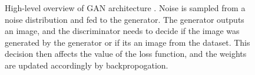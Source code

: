 \begin{figure}
{
    }
    \caption{High-level overview of GAN architecture \cite{gan}. Noise is sampled from a noise distribution and fed to the generator. The generator outputs an image, and the discriminator needs to decide if the image was generated by the generator or if its an image from the dataset. This decision then affects the value of the loss function, and the weights are updated accordingly by backpropogation.}
    \label{fig:gan_architecture_highlevel}
\end{figure}